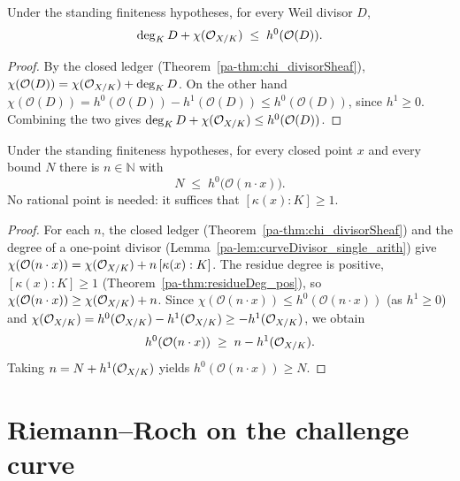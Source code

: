 \begin{theorem}
  \label{pa-thm:riemann_inequality}
  \leanok

  Under the standing finiteness hypotheses, for every Weil divisor \(D\),
  \[
    \deg_K D + \chi(\mathcal{O}_{X/K}) \;\le\; h^0(\mathcal O(D)).
  \]
\end{theorem}
\begin{proof}
  \leanok
  By the closed ledger (Theorem~\ref{pa-thm:chi_divisorSheaf}),
  \(\chi(\mathcal O(D)) = \chi(\mathcal{O}_{X/K}) + \deg_K D\). On the other hand
  \(\chi(\mathcal O(D)) = h^0(\mathcal O(D)) - h^1(\mathcal O(D)) \le h^0(\mathcal O(D))\), since
  \(h^1 \ge 0\). Combining the two gives \(\deg_K D + \chi(\mathcal{O}_{X/K}) \le h^0(\mathcal O(D))\).
\end{proof}

\begin{theorem}
  \label{pa-thm:h0_nsmul_point_unbounded}
  \leanok

  Under the standing finiteness hypotheses, for every closed point \(x\) and every bound \(N\)
  there is \(n \in \mathbb N\) with
  \[
    N \;\le\; h^0\bigl(\mathcal O(n \cdot x)\bigr).
  \]
  No rational point is needed: it suffices that \([\kappa(x):K] \ge 1\).
\end{theorem}
\begin{proof}
  \leanok
  For each \(n\), the closed ledger (Theorem~\ref{pa-thm:chi_divisorSheaf}) and the degree of a
  one-point divisor (Lemma~\ref{pa-lem:curveDivisor_single_arith}) give
  \(\chi(\mathcal O(n\cdot x)) = \chi(\mathcal{O}_{X/K}) + n\,[\kappa(x):K]\). The residue degree is
  positive, \([\kappa(x):K] \ge 1\) (Theorem~\ref{pa-thm:residueDeg_pos}), so
  \(\chi(\mathcal O(n\cdot x)) \ge \chi(\mathcal{O}_{X/K}) + n\). Since
  \(\chi(\mathcal O(n\cdot x)) \le h^0(\mathcal O(n\cdot x))\) (as \(h^1 \ge 0\)) and
  \(\chi(\mathcal{O}_{X/K}) = h^0(\mathcal{O}_{X/K}) - h^1(\mathcal{O}_{X/K}) \ge -h^1(\mathcal{O}_{X/K})\), we obtain
  \[
    h^0(\mathcal O(n\cdot x)) \;\ge\; n - h^1(\mathcal{O}_{X/K}).
  \]
  Taking \(n = N + h^1(\mathcal{O}_{X/K})\) yields \(h^0(\mathcal O(n\cdot x)) \ge N\).
\end{proof}

\section{Riemann--Roch on the challenge curve}

